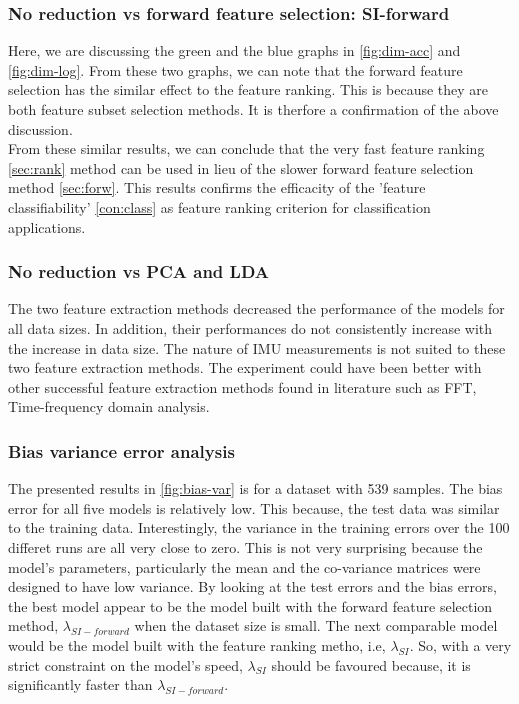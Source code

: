 \subsubsection{No reduction vs forward feature selection: SI-forward}
Here, we are discussing the green and the blue graphs in \ref{fig:dim-acc} and \ref{fig:dim-log}. From these two graphs, we can note that the forward feature selection has the similar effect to the feature ranking. This is because they are both feature subset selection methods. It is therfore a confirmation of the above discussion.\\
From these similar results, we can conclude that the very fast feature ranking \ref{sec:rank} method can be used in lieu of the slower forward feature selection method \ref{sec:forw}. This results confirms the efficacity of the 'feature classifiability' \ref{con:class} as feature ranking criterion for classification applications.

\subsubsection{No reduction vs PCA and LDA}

The two feature extraction methods decreased the performance of the models for all data sizes. In addition, their performances do not consistently increase with the increase in data size. The nature of IMU measurements is not suited to these two feature extraction methods. The experiment could have been better with other successful feature extraction methods found in literature such as FFT, %
Time-frequency domain analysis. %

\subsubsection{Bias variance error analysis}
The presented results in \ref{fig:bias-var} is for a dataset with 539 samples.
The bias error for all five models is relatively low. This because, the test data was similar to the training data. 
Interestingly, the variance in the training errors over the 100 differet runs are all very close to zero. This is not very surprising because the model's parameters, particularly the mean and the co-variance matrices were designed to have low variance. %
By looking at the test errors and the bias errors, the best model appear to be the model built with the forward feature selection method, \(\lambda_{SI-forward}\) when the dataset size is small. The next comparable model would be the model built with the feature ranking metho, i.e, \(\lambda_{SI}\). So, with a very strict constraint on the model's speed, \(\lambda_{SI}\) should be favoured because, it is significantly faster than \(\lambda_{SI-forward}\).


